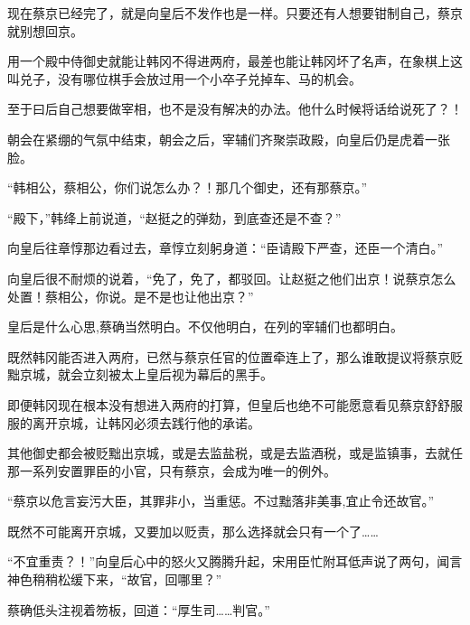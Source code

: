 现在蔡京已经完了，就是向皇后不发作也是一样。只要还有人想要钳制自己，蔡京就别想回京。

用一个殿中侍御史就能让韩冈不得进两府，最差也能让韩冈坏了名声，在象棋上这叫兑子，没有哪位棋手会放过用一个小卒子兑掉车、马的机会。

至于曰后自己想要做宰相，也不是没有解决的办法。他什么时候将话给说死了？！

朝会在紧绷的气氛中结束，朝会之后，宰辅们齐聚崇政殿，向皇后仍是虎着一张脸。

“韩相公，蔡相公，你们说怎么办？！那几个御史，还有那蔡京。”

“殿下，”韩绛上前说道，“赵挺之的弹劾，到底查还是不查？”

向皇后往章惇那边看过去，章惇立刻躬身道：“臣请殿下严查，还臣一个清白。”

向皇后很不耐烦的说着，“免了，免了，都驳回。让赵挺之他们出京！说蔡京怎么处置！蔡相公，你说。是不是也让他出京？”

皇后是什么心思,蔡确当然明白。不仅他明白，在列的宰辅们也都明白。

既然韩冈能否进入两府，已然与蔡京任官的位置牵连上了，那么谁敢提议将蔡京贬黜京城，就会立刻被太上皇后视为幕后的黑手。

即便韩冈现在根本没有想进入两府的打算，但皇后也绝不可能愿意看见蔡京舒舒服服的离开京城，让韩冈必须去践行他的承诺。

其他御史都会被贬黜出京城，或是去监盐税，或是去监酒税，或是监镇事，去就任那一系列安置罪臣的小官，只有蔡京，会成为唯一的例外。

“蔡京以危言妄污大臣，其罪非小，当重惩。不过黜落非美事,宜止令还故官。”

既然不可能离开京城，又要加以贬责，那么选择就会只有一个了……

“不宜重责？！”向皇后心中的怒火又腾腾升起，宋用臣忙附耳低声说了两句，闻言神色稍稍松缓下来，“故官，回哪里？”

蔡确低头注视着笏板，回道：“厚生司……判官。”

